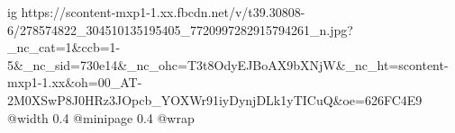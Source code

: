  
 
 
 
 

\ifcmt
  ig https://scontent-mxp1-1.xx.fbcdn.net/v/t39.30808-6/278574822_304510135195405_7720997282915794261_n.jpg?_nc_cat=1&ccb=1-5&_nc_sid=730e14&_nc_ohc=T3t8OdyEJBoAX9bXNjW&_nc_ht=scontent-mxp1-1.xx&oh=00_AT-2M0XSwP8J0HRz3JOpcb_YOXWr91iyDynjDLk1yTICuQ&oe=626FC4E9
  @width 0.4
  @minipage 0.4
  @wrap \parpic[r]
\fi
